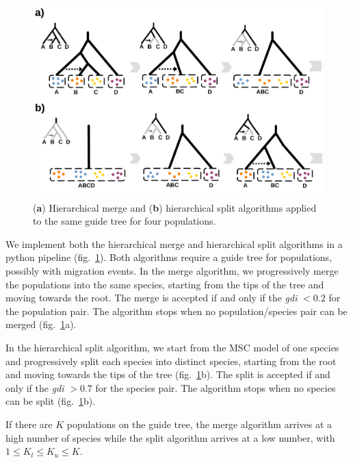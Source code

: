 \documentclass[A4]{article1}
\begin{document}
\begin{figure}
   \centering %
   \includegraphics[scale=0.25]{figs/Methods/HM_algo} %
   
   \caption{(\textbf{a}) Hierarchical merge and (\textbf{b}) hierarchical split
   algorithms applied to the same guide tree for four populations. \\%
	} 
	\label{fig:gdi-algorithms}
\end{figure}

We implement both the hierarchical merge and hierarchical split algorithms in a python
pipeline (fig.~\ref{fig:gdi-algorithms}).  Both algorithms require a guide tree for
populations, possibly with migration events.  In the merge algorithm, we progressively
merge the populations into the same species, starting from the tips of the tree and moving
towards the root.  The merge is accepted if and only if the \textit{gdi} $< 0.2$ for the
population pair.  The algorithm stops when no population/species pair can be merged
(fig.~\ref{fig:gdi-algorithms}a).

In the hierarchical split algorithm, we start from the MSC model of one species and
progressively split each species into distinct species, starting from the root and moving
towards the tips of the tree (fig.~\ref{fig:gdi-algorithms}b).  The split is accepted if and
only if the \textit{gdi} $> 0.7$ for the species pair.  The algorithm stops when no
species can be split (fig.~\ref{fig:gdi-algorithms}b).

If there are $K$ populations on the guide tree, the merge algorithm arrives at a high
number of species while the split algorithm arrives at a low number, with $1 \le K_l \le
K_u \le K $.

\clearpage
\newpage
\end{document}
